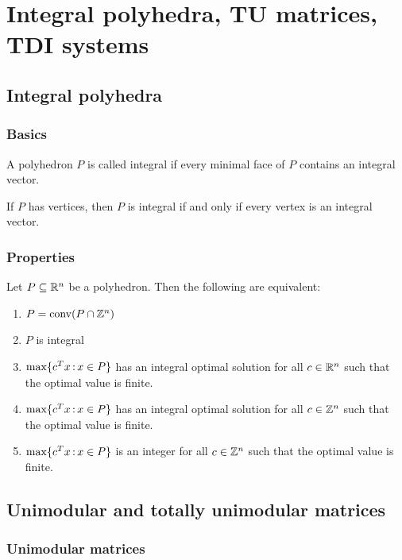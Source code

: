 \documentclass[../open-optimization/open-optimization.tex]{subfiles}
\begin{document}
\chapter{Integral polyhedra, TU matrices, TDI systems}

\section{Integral polyhedra}
 \subsection{Basics}
\begin{definition}
A polyhedron $P$ is called integral if every minimal face of $P$ contains an integral vector.
\end{definition}


\begin{remark} If $P$ has vertices, then $P$ is integral if and only if every vertex is an integral vector.
\end{remark}

 \subsection{Properties}

\begin{theorem} Let $P\subseteq{\mathbb{R}}^n$ be a polyhedron. Then the following are equivalent:
\begin{enumerate}
	\item $P=\textup{conv}(P\cap{\mathbb{Z}}^n)$
	\item $P$ is integral
	\item $\max\{c^Tx{\,:\,} x\in P\}$ has an integral optimal solution for all $c\in{\mathbb{R}}^n$ such that the optimal value is finite.
	\item $\max\{c^Tx{\,:\,} x\in P\}$ has an integral optimal solution for all $c\in{\mathbb{Z}}^n$ such that the optimal value is finite.
	\item  $\max\{c^Tx{\,:\,} x\in P\}$ is an integer for all $c\in{\mathbb{Z}}^n$ such that the optimal value is finite.
\end{enumerate}
\end{theorem}


\section{Unimodular and totally unimodular matrices}
\subsection{Unimodular matrices}
\end{document}
